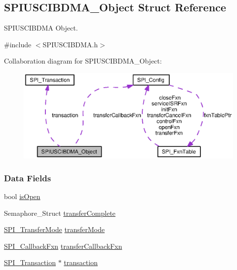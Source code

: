 \subsection{S\-P\-I\-U\-S\-C\-I\-B\-D\-M\-A\-\_\-\-Object Struct Reference}
\label{struct_s_p_i_u_s_c_i_b_d_m_a___object}


S\-P\-I\-U\-S\-C\-I\-B\-D\-M\-A Object.  




{\ttfamily \#include $<$S\-P\-I\-U\-S\-C\-I\-B\-D\-M\-A.\-h$>$}



Collaboration diagram for S\-P\-I\-U\-S\-C\-I\-B\-D\-M\-A\-\_\-\-Object\-:
\nopagebreak
\begin{figure}[H]
\begin{center}
\leavevmode
\includegraphics[width=350pt]{struct_s_p_i_u_s_c_i_b_d_m_a___object__coll__graph}
\end{center}
\end{figure}
\subsubsection*{Data Fields}
\begin{DoxyCompactItemize}
\item 
bool \hyperlink{struct_s_p_i_u_s_c_i_b_d_m_a___object_a3e6b8bb83a3cf4a65fa6fe64e621f201}{is\-Open}
\item 
Semaphore\-\_\-\-Struct \hyperlink{struct_s_p_i_u_s_c_i_b_d_m_a___object_a2facffa8ef32c57613836f4470125114}{transfer\-Complete}
\item 
\hyperlink{_s_p_i_8h_ab9ea76c6529d6076eee5e1c4a5a92c6f}{S\-P\-I\-\_\-\-Transfer\-Mode} \hyperlink{struct_s_p_i_u_s_c_i_b_d_m_a___object_a2703d15ee77ccec6100bbba531c1e83d}{transfer\-Mode}
\item 
\hyperlink{_s_p_i_8h_aeb03e7608a14021c3b0acf92c90e2168}{S\-P\-I\-\_\-\-Callback\-Fxn} \hyperlink{struct_s_p_i_u_s_c_i_b_d_m_a___object_aa0f097248d6ba037d9c6fd40a0e13575}{transfer\-Callback\-Fxn}
\item 
\hyperlink{struct_s_p_i___transaction}{S\-P\-I\-\_\-\-Transaction} $\ast$ \hyperlink{struct_s_p_i_u_s_c_i_b_d_m_a___object_a5befed95856b2c43b79b6a8eb5c67b0d}{transaction}
\end{DoxyCompactItemize}


